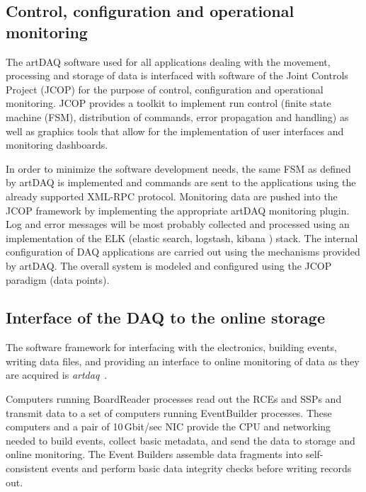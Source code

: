 \subsection{Control, configuration and operational monitoring}

The artDAQ software used for all applications dealing with the movement,
processing and storage of data is interfaced with software of the
Joint Controls Project (JCOP) for the purpose of control, configuration
and operational monitoring.  JCOP provides a toolkit to implement run
control (finite state machine (FSM), distribution of commands, error
propagation and handling) as well as graphics tools that allow for the
implementation of user interfaces and monitoring dashboards.  

In order to
minimize the software development needs, the same FSM as defined by artDAQ
is implemented and commands are sent to the applications using
the already supported XML-RPC protocol.  Monitoring data are pushed
into the JCOP framework by implementing the appropriate artDAQ monitoring
plugin.  Log and error messages will be most probably collected and
processed using an implementation of the ELK (elastic search, logstash,
kibana \cite{elastic:kibana}) stack. 
 The internal configuration of DAQ applications are
carried out using the mechanisms provided by artDAQ. The overall system
is modeled and configured using the JCOP paradigm (data points).


\subsection{Interface of the DAQ to the online storage}
\label{sec:DAQ_online_interface}

The software framework for
interfacing with the electronics, building events, writing data files,
and providing an interface to online monitoring of data as they are
acquired is \textit{artdaq}~\cite{artdaq}. 

Computers running BoardReader processes read out
the RCEs and SSPs and transmit data to a set of computers running EventBuilder processes.
These computers and a
pair of 10\,Gbit/sec NIC provide the CPU and networking needed to
build events, collect basic metadata, and send the data to storage and
online monitoring.  The Event Builders assemble data fragments into self-consistent events and perform basic data integrity checks before writing records out.


